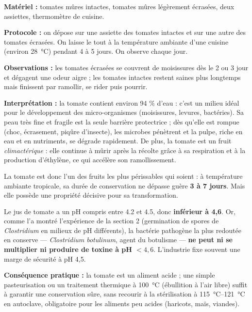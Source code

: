 \documentclass[11pt]{article}
\newcommand{\cle}[1]{{\popxbold\color{popdark}#1}}
\begin{document}
\begin{experience}
\textbf{Matériel :} tomates mûres intactes, tomates mûres légèrement écrasées, deux assiettes, thermomètre de cuisine.

\textbf{Protocole :} on dépose sur une assiette des tomates intactes et sur une autre des tomates écrasées. On laisse le tout à la température ambiante d'une cuisine (environ \SI{28}{\celsius}) pendant 4 à 5 jours. On observe chaque jour.

\textbf{Observations :} les tomates écrasées se couvrent de moisissures dès le 2\ieme{} ou 3\ieme{} jour et dégagent une odeur aigre ; les tomates intactes restent saines plus longtemps mais finissent par ramollir, se rider puis pourrir.

\textbf{Interprétation :} la tomate contient environ \cle{94 \% d'eau} : c'est un milieu idéal pour le développement des micro-organismes (moisissures, levures, bactéries). Sa \cle{peau très fine et fragile} est la seule barrière protectrice ; dès qu'elle est rompue (choc, écrasement, piqûre d'insecte), les microbes pénètrent et la pulpe, riche en eau et en nutriments, se dégrade rapidement. De plus, la tomate est un fruit \emph{climactérique} : elle continue à mûrir après la récolte grâce à sa respiration et à la production d'éthylène, ce qui accélère son ramollissement.
\end{experience}

La tomate est donc l'un des fruits les plus \cle{périssables} qui soient : à température ambiante tropicale, sa durée de conservation ne dépasse guère \textbf{3 à 7 jours}. Mais elle possède une propriété décisive pour sa transformation.

\begin{propriete}
Le jus de tomate a un pH compris entre \num{4,2} et \num{4,5}, donc \textbf{inférieur à 4,6}. Or, comme l'a montré l'expérience de la section 2 (germination de spores de \emph{Clostridium} en milieux de pH différents), la bactérie pathogène la plus redoutée en conserve — \emph{Clostridium botulinum}, agent du botulisme — \textbf{ne peut ni se multiplier ni produire de toxine à pH $< 4,6$}. L'industrie fixe souvent une marge de sécurité à pH 4,5.

\textbf{Conséquence pratique :} la tomate est un aliment \cle{acide} ; une simple \cle{pasteurisation} ou un traitement thermique à \SI{100}{\celsius} (ébullition à l'air libre) suffit à garantir une conservation sûre, sans recourir à la stérilisation à \SI{115}{\celsius}--\SI{121}{\celsius} en autoclave, obligatoire pour les aliments peu acides (haricots, maïs, viandes).
\end{propriete}
\end{document}
